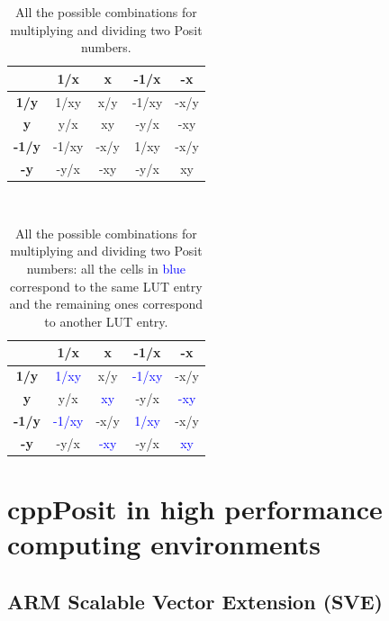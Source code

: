 \begin{table}[]
\centering
\caption{All the possible combinations for multiplying and dividing two Posit numbers.}
\label{tab:tab_mul_full}
\begin{tabular}{ccccc}
\hline
\textbf{}     & \textbf{1/x} & \textbf{x} & \textbf{-1/x} & \textbf{-x} \\ \hline
\textbf{1/y}  & 1/xy         & x/y        & -1/xy         & -x/y        \\ \hline
\textbf{y}    & y/x          & xy         & -y/x          & -xy         \\ \hline
\textbf{-1/y} & -1/xy        & -x/y       & 1/xy          & -x/y        \\ \hline
\textbf{-y}   & -y/x         & -xy        & -y/x          & xy          \\ \hline
\end{tabular}
\end{table}

\begin{table}[]
\centering
\caption{All the possible combinations for multiplying and dividing two Posit numbers: all the cells in \textcolor{blue}{blue} correspond to the same LUT entry and the remaining ones correspond to another LUT entry.} \
\label{tab:tab_mul_color}
\begin{tabular}{ccccc}
\hline
\textbf{}     & \textbf{1/x} & \textbf{x} & \textbf{-1/x} & \textbf{-x} \\ \hline
\textbf{1/y}  & \textcolor{blue}{1/xy}         & x/y        & \textcolor{blue}{-1/xy}         & -x/y        \\ \hline
\textbf{y}    & y/x          & \textcolor{blue}{xy}         & -y/x          & \textcolor{blue}{-xy}         \\ \hline
\textbf{-1/y} & \textcolor{blue}{-1/xy}        & -x/y       & \textcolor{blue}{1/xy }         & -x/y        \\ \hline
\textbf{-y}   & -y/x         &\textcolor{blue}{ -xy}        & -y/x          & \textcolor{blue}{xy}          \\ \hline
\end{tabular}
\end{table}

\section{cppPosit in high performance computing environments}
\subsection{ARM Scalable Vector Extension (SVE)}

